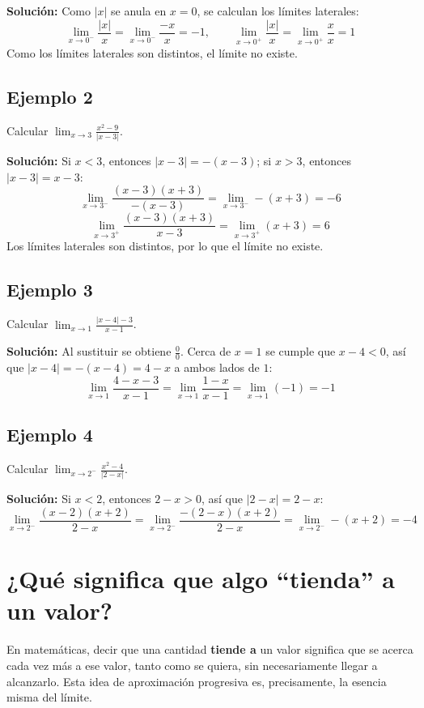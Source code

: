 \documentclass[12pt]{article}
\begin{document}
\textbf{Solución:} Como $|x|$ se anula en $x = 0$, se calculan los límites laterales:
\[
\lim_{x \to 0^-} \frac{|x|}{x} = \lim_{x \to 0^-} \frac{-x}{x} = -1, \qquad
\lim_{x \to 0^+} \frac{|x|}{x} = \lim_{x \to 0^+} \frac{x}{x} = 1
\]
Como los límites laterales son distintos, el límite no existe.

\subsection{Ejemplo 2}
Calcular $\displaystyle \lim_{x \to 3} \frac{x^2 - 9}{|x - 3|}$.

\textbf{Solución:} Si $x < 3$, entonces $|x - 3| = -(x - 3)$; si $x > 3$, entonces $|x - 3| = x - 3$:
\[
\lim_{x \to 3^-} \frac{(x - 3)(x + 3)}{-(x - 3)} = \lim_{x \to 3^-} -(x + 3) = -6
\]
\[
\lim_{x \to 3^+} \frac{(x - 3)(x + 3)}{x - 3} = \lim_{x \to 3^+} (x + 3) = 6
\]
Los límites laterales son distintos, por lo que el límite no existe.

\subsection{Ejemplo 3}
Calcular $\displaystyle \lim_{x \to 1} \frac{|x - 4| - 3}{x - 1}$.

\textbf{Solución:} Al sustituir se obtiene $\frac{0}{0}$. Cerca de $x = 1$ se cumple que $x - 4 < 0$, así que $|x - 4| = -(x - 4) = 4 - x$ a ambos lados de $1$:
\[
\lim_{x \to 1} \frac{4 - x - 3}{x - 1} = \lim_{x \to 1} \frac{1 - x}{x - 1} = \lim_{x \to 1} (-1) = -1
\]

\subsection{Ejemplo 4}
Calcular $\displaystyle \lim_{x \to 2^-} \frac{x^2 - 4}{|2 - x|}$.

\textbf{Solución:} Si $x < 2$, entonces $2 - x > 0$, así que $|2 - x| = 2 - x$:
\[
\lim_{x \to 2^-} \frac{(x - 2)(x + 2)}{2 - x} = \lim_{x \to 2^-} \frac{-(2 - x)(x + 2)}{2 - x} = \lim_{x \to 2^-} -(x + 2) = -4
\]

\section{¿Qué significa que algo ``tienda'' a un valor?}

En matemáticas, decir que una cantidad \textbf{tiende a} un valor significa que se acerca cada vez más a ese valor, tanto como se quiera, sin necesariamente llegar a alcanzarlo. Esta idea de aproximación progresiva es, precisamente, la esencia misma del límite.
\end{document}
